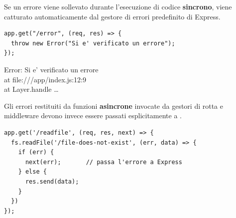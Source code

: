 Se un errore viene sollevato durante l'esecuzione di codice \textbf{sincrono},
viene catturato automaticamente dal gestore di errori predefinito di Express.

\begin{affianco}[0.5][c]
\begin{lstlisting}[style=js]
app.get("/error", (req, res) => {
  throw new Error("Si e' verificato un errore");
});
\end{lstlisting}
\risultato
\begin{browser}
  {\FiraCodeNL\scriptsize Error: Si e' verificato un errore\\
   \hspace*{1em}at file:///app/index.js:12:9\\
   \hspace*{1em}at Layer.handle \ldots}
\end{browser}
\end{affianco}

Gli errori restituiti da funzioni \textbf{asincrone} invocate da gestori di
rotta e middleware devono invece essere passati esplicitamente a .

\begin{affianco}[0.5][c]
\begin{lstlisting}[style=js, name=async-error.js]
app.get('/readfile', (req, res, next) => {
  fs.readFile('/file-does-not-exist', (err, data) => {
    if (err) {
      next(err);       // passa l'errore a Express
    } else {
      res.send(data);
    }
  })
});
\end{lstlisting}
\risultato
\begin{immagine}
\end{immagine}
\end{affianco}


